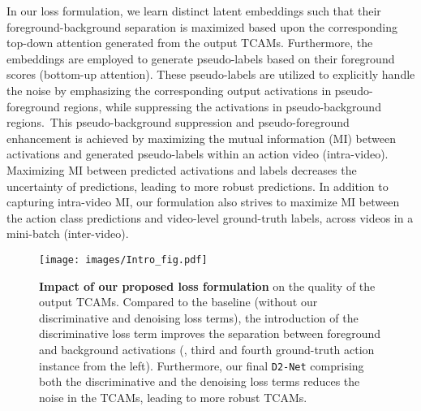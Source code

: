 \documentclass[final]{cvpr}
\def\proposed{\texttt{D2-Net}{}}
\begin{document}
In our loss formulation, we learn distinct latent embeddings such that their foreground-background separation is maximized based upon the corresponding top-down attention generated from the output TCAMs. 
Furthermore, the embeddings are employed to generate pseudo-labels based on their foreground scores (bottom-up attention). These pseudo-labels are utilized to explicitly handle the noise by emphasizing the corresponding output activations in pseudo-foreground regions, while suppressing the activations in pseudo-background regions.~This pseudo-background suppression and pseudo-foreground enhancement is achieved by maximizing the mutual information (MI) between activations and generated pseudo-labels within an action video (intra-video). Maximizing MI between predicted activations and labels decreases the uncertainty of predictions, leading to more robust predictions. In addition to capturing intra-video MI, our formulation also strives to maximize MI between the action class predictions and video-level ground-truth labels, across videos in a mini-batch (inter-video).  



\begin{figure}[t]
    \centering
    \texttt{[image: images/Intro\_fig.pdf]}
    \vspace{-0.1cm}
    \caption{\textbf{Impact of our proposed loss formulation} on the quality of the output TCAMs. Compared to the baseline (without our discriminative and denoising loss terms), the introduction of the discriminative loss term improves the separation between foreground and background activations (\eg, third and fourth ground-truth action instance from the left). Furthermore, our final \proposed{} comprising both the discriminative and the denoising loss terms reduces the noise in the TCAMs, leading to more robust TCAMs.  
    \vspace{-0.3cm}}
    \label{fig:denoise_intuition}
\end{figure}
\end{document}
